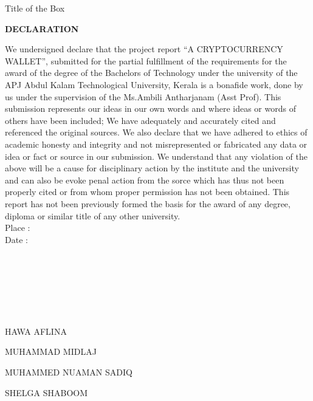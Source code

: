 \documentclass[12pt]{article}
\begin{document}
\begin{boxed}{Title of the Box}


\vspace*{30px}
\begin{center}\LARGE\bf{DECLARATION}\end{center}

We undersigned declare that the project report “A CRYPTOCURRENCY WALLET”, submitted for the partial fulfillment of the requirements for
the award of the degree of the Bachelors of Technology under the university of
the APJ Abdul Kalam Technological University, Kerala is a bonafide work,
done by us under the supervision of the Ms.Ambili Antharjanam (Asst Prof). This
submission represents our ideas in our own words and where ideas or words
of others have been included; We have adequately and accurately cited and
referenced the original sources. We also declare that we have adhered to ethics
of academic honesty and integrity and not misrepresented or fabricated any
data or idea or fact or source in our submission. We understand that any
violation of the above will be a cause for disciplinary action by the
institute and the university and can also be evoke penal action from the sorce
which has thus not been properly cited or from whom proper permission has
not been obtained. This report has not been previously formed the basis for
the award of any degree, diploma or similar title of any other university.
\\Place :
\\Date :
\\
\\
\\
\\
\\
\\
\\
\begin{center}HAWA AFLINA\end{center}\vspace{-6mm}
\begin{center}MUHAMMAD MIDLAJ\end{center}\vspace{-7mm}
\begin{center}MUHAMMED NUAMAN SADIQ\end{center}\vspace{-7mm}
\begin{center}SHELGA SHABOOM\end{center}\vspace{-7mm}




\end{boxed}
\end{document}

